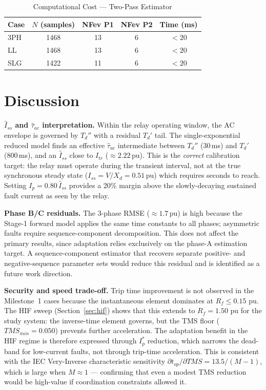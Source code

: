 \documentclass[journal, twoside, 10pt]{IEEEtran}
\newcommand{\pu}{\,\text{pu}}
\begin{document}
\begin{table}[!t]
\caption{Computational Cost — Two-Pass Estimator}
\label{tab:compute}
\centering
\renewcommand{\arraystretch}{1.12}
\begin{tabular}{@{}lcccc@{}}
\toprule
Case & $N$ (samples) & NFev P1 & NFev P2 & Time (ms) \\
\midrule
3PH  & 1468 & 13 & 6 & $<20$ \\
LL   & 1468 & 13 & 6 & $<20$ \\
SLG  & 1422 & 11 & 6 & $<20$ \\
\bottomrule
\end{tabular}
\end{table}

\section{Discussion}
\label{sec:discussion}

\textbf{$\hat{I}_{ss}$ and $\hat{\tau}_{ac}$ interpretation.}
Within the relay operating window, the AC envelope is governed by $T_d''$
with a residual $T_d'$ tail.  The single-exponential reduced model finds an
effective $\hat{\tau}_{ac}$ intermediate between $T_d''$ (30\,ms) and $T_d'$
(800\,ms), and an $\hat{I}_{ss}$ close to $I_{tr}$ ($\approx 2.22\,\text{pu}$).
This is the \emph{correct} calibration target: the relay must operate during
the transient interval, not at the true synchronous steady state ($I_{ss} =
V/X_d = 0.51\,\text{pu}$) which requires seconds to reach.
Setting $I_p = 0.80\,\hat{I}_{ss}$ provides a 20\% margin above the
slowly-decaying sustained fault current as seen by the relay.

\textbf{Phase B/C residuals.}
The 3-phase RMSE ($\approx 1.7\,\text{pu}$) is high because the Stage-1
forward model applies the same time constants to all phases; asymmetric faults
require sequence-component decomposition.  This does not affect the primary
results, since adaptation relies exclusively on the phase-A estimation target.
A sequence-component estimator that recovers separate positive- and
negative-sequence parameter sets would reduce this residual and is identified
as a future work direction.

\textbf{Security and speed trade-off.}
Trip time improvement is not observed in the Milestone~1 cases because the
instantaneous element dominates at $R_f \leq 0.15\,\pu$.  The HIF sweep
(Section~\ref{sec:hif}) shows that this extends to $R_f = 1.50\,\pu$ for
the study system: the inverse-time element governs, but the TMS floor
($TMS_{min} = 0.050$) prevents further acceleration.  The adaptation benefit
in the HIF regime is therefore expressed through $I_p^*$ reduction, which
narrows the dead-band for low-current faults, not through trip-time
acceleration.  This is consistent with the IEC Very-Inverse characteristic
sensitivity $\partial t_{op}/\partial TMS = 13.5/(M-1)$, which is large
when $M \approx 1$ --- confirming that even a modest TMS reduction would
be high-value if coordination constraints allowed it.
\end{document}
